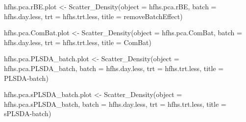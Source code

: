 \documentclass[
]{book}
\newenvironment{Shaded}{\begin{snugshade}}{\end{snugshade}}
\newcommand{\AttributeTok}[1]{\textcolor[rgb]{0.77,0.63,0.00}{#1}}
\newcommand{\FunctionTok}[1]{\textcolor[rgb]{0.00,0.00,0.00}{#1}}
\newcommand{\NormalTok}[1]{#1}
\newcommand{\OtherTok}[1]{\textcolor[rgb]{0.56,0.35,0.01}{#1}}
\newcommand{\StringTok}[1]{\textcolor[rgb]{0.31,0.60,0.02}{#1}}
\begin{document}
\begin{Shaded}
\begin{Highlighting}[]
\NormalTok{hfhs.pca.rBE.plot }\OtherTok{\textless{}{-}} 
  \FunctionTok{Scatter\_Density}\NormalTok{(}\AttributeTok{object =}\NormalTok{ hfhs.pca.rBE, }
                  \AttributeTok{batch =}\NormalTok{ hfhs.day.less, }
                  \AttributeTok{trt =}\NormalTok{ hfhs.trt.less, }
                  \AttributeTok{title =} \StringTok{\textquotesingle{}removeBatchEffect\textquotesingle{}}\NormalTok{)}
\end{Highlighting}
\end{Shaded}

\begin{Shaded}
\begin{Highlighting}[]
\NormalTok{hfhs.pca.ComBat.plot }\OtherTok{\textless{}{-}} 
  \FunctionTok{Scatter\_Density}\NormalTok{(}\AttributeTok{object =}\NormalTok{ hfhs.pca.ComBat, }
                  \AttributeTok{batch =}\NormalTok{ hfhs.day.less, }
                  \AttributeTok{trt =}\NormalTok{ hfhs.trt.less,}
                  \AttributeTok{title =} \StringTok{\textquotesingle{}ComBat\textquotesingle{}}\NormalTok{)}
\end{Highlighting}
\end{Shaded}

\begin{Shaded}
\begin{Highlighting}[]
\NormalTok{hfhs.pca.PLSDA\_batch.plot }\OtherTok{\textless{}{-}} 
  \FunctionTok{Scatter\_Density}\NormalTok{(}\AttributeTok{object =}\NormalTok{ hfhs.pca.PLSDA\_batch, }
                  \AttributeTok{batch =}\NormalTok{ hfhs.day.less, }
                  \AttributeTok{trt =}\NormalTok{ hfhs.trt.less, }
                  \AttributeTok{title =} \StringTok{\textquotesingle{}PLSDA{-}batch\textquotesingle{}}\NormalTok{)}
\end{Highlighting}
\end{Shaded}

\begin{Shaded}
\begin{Highlighting}[]
\NormalTok{hfhs.pca.sPLSDA\_batch.plot }\OtherTok{\textless{}{-}} 
  \FunctionTok{Scatter\_Density}\NormalTok{(}\AttributeTok{object =}\NormalTok{ hfhs.pca.sPLSDA\_batch, }
                  \AttributeTok{batch =}\NormalTok{ hfhs.day.less, }
                  \AttributeTok{trt =}\NormalTok{ hfhs.trt.less, }
                  \AttributeTok{title =} \StringTok{\textquotesingle{}sPLSDA{-}batch\textquotesingle{}}\NormalTok{)}
\end{Highlighting}
\end{Shaded}
\end{document}
